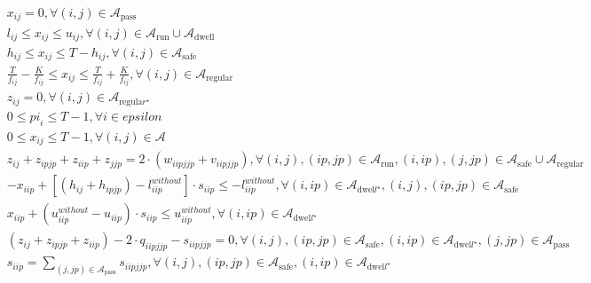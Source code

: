 \begin{align}
  & x_{i j} = 0 , \forall \left(i , j\right) \in \mathbf{\mathcal{A}}_{\text{pass}} \tag{eq\_0034} \\
  & l_{i j} \leq x_{i j} \leq u_{i j} , \forall \left(i , j\right) \in \mathbf{\mathcal{A}}_{\text{run}} \cup \mathbf{\mathcal{A}}_{\text{dwell}} \tag{eq\_0035} \\
  & h_{i j} \leq x_{i j} \leq T - h_{i j} , \forall \left(i , j\right) \in \mathbf{\mathcal{A}}_{\text{safe}} \tag{eq\_0036} \\
  & \frac{T}{f_{i j}} - \frac{K}{f_{i j}} \leq x_{i j} \leq \frac{T}{f_{i j}} + \frac{K}{f_{i j}} , \forall \left(i , j\right) \in \mathbf{\mathcal{A}}_{\text{regular}} \tag{eq\_0037} \\
  & z_{i j} = 0 , \forall \left(i , j\right) \in \mathbf{\mathcal{A}}_{\text{regula} r^{\star}} \tag{eq\_0038} \\
  & 0 \leq \mathit{pi}_{i} \leq T - 1 , \forall i \in \mathit{epsilon} \tag{eq\_0040} \\
  & 0 \leq x_{i j} \leq T - 1 , \forall \left(i , j\right) \in \mathbf{\mathcal{A}} \tag{eq\_0041} \\
  & z_{i j} + z_{ip jp} + z_{i ip} + z_{j jp} = 2 \cdot \left(w_{i ip j jp} + v_{i ip j jp}\right) , \forall \left(i , j\right) , \left(ip , jp\right) \in \mathbf{\mathcal{A}}_{\text{run}} , \left(i , ip\right) , \left(j , jp\right) \in \mathbf{\mathcal{A}}_{\text{safe}} \cup \mathbf{\mathcal{A}}_{\text{regular}} \tag{eq\_0042} \\
  & - x_{i ip} + \left[\left(h_{i j} + h_{ip jp}\right) - l_{i ip}^{w i t h o u t}\right] \cdot s_{i ip} \leq - l_{i ip}^{w i t h o u t} , \forall \left(i , ip\right) \in \mathbf{\mathcal{A}}_{\text{dwel} l^{\star}} , \left(i , j\right) , \left(ip , jp\right) \in \mathbf{\mathcal{A}}_{\text{safe}} \tag{eq\_0043} \\
  & x_{i ip} + \left(u_{i ip}^{w i t h o u t} - u_{i ip}\right) \cdot s_{i ip} \leq u_{i ip}^{w i t h o u t} , \forall \left(i , ip\right) \in \mathbf{\mathcal{A}}_{\text{dwel} l^{\star}} \tag{eq\_0044} \\
  & \left(z_{i j} + z_{ip jp} + z_{i ip}\right) - 2 \cdot q_{i ip j jp} - s_{i ip j jp} = 0 , \forall \left(i , j\right) , \left(ip , jp\right) \in \mathbf{\mathcal{A}}_{\text{safe}} , \left(i , ip\right) \in \mathbf{\mathcal{A}}_{\text{dwel} l^{\star}} , \left(j , jp\right) \in \mathbf{\mathcal{A}}_{\text{pass}} \tag{eq\_0045} \\
  & s_{i ip} = \underset{\left(j , jp\right) \in \mathbf{\mathcal{A}}_{\text{pass}}}{\sum} s_{i ip j jp} , \forall \left(i , j\right) , \left(ip , jp\right) \in \mathbf{\mathcal{A}}_{\text{safe}} , \left(i , ip\right) \in \mathbf{\mathcal{A}}_{\text{dwel} l^{\star}} \tag{eq\_0046} \\

\end{align}
